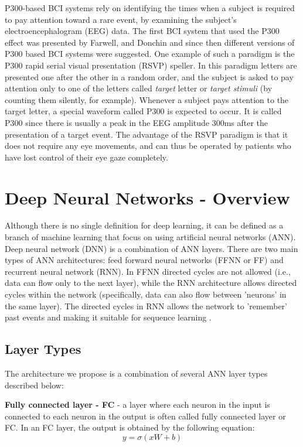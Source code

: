 \documentclass[
12pt, %
english, %
doublespacing, %
headsepline, %
]{MastersDoctoralThesis} %
\begin{document}
P300-based BCI systems rely on identifying the times when a subject is required to pay attention toward a rare event, by examining the subject's electroencephalogram (EEG) data. The first BCI system that used the P300 effect was presented by Farwell, and Donchin \cite{FirstP300} and since then different versions of P300 based BCI systems were suggested. One example of such a paradigm is the P300 rapid serial visual presentation (RSVP) speller. In this paradigm letters are presented one after the other in a random order, and the subject is asked to pay attention only to one of the letters called \textit{target} letter or \textit{target stimuli} (by counting them silently, for example). Whenever a subject pays attention to the target letter, a special waveform called P300 is expected to occur. It is called P300 since there is usually a peak in the EEG amplitude 300ms after the presentation of a target event. The advantage of the RSVP paradigm is that it does not require any eye movements, and can thus be operated by patients who have lost control of their eye gaze completely.

\section{Deep Neural Networks - Overview}

Although there is no single definition for deep learning, it can be defined as a branch of machine learning that focus on using artificial neural networks (ANN). Deep neural network (DNN) is a combination of ANN layers. There are two main types of ANN architectures: feed forward neural networks (FFNN or FF) and recurrent neural network (RNN). In FFNN directed cycles are not allowed (i.e., data can flow only to the next layer), while the RNN architecture allows directed cycles within the network (specifically, data can also flow between 'neurons' in the same layer). The directed cycles in RNN allows the network to 'remember' past events and making it suitable for sequence learning \cite{rumelhart1985learning}.

\subsection{Layer Types}
The architecture we propose is a combination of several ANN layer types described below:

\textbf{Fully connected layer - FC} - a layer where each neuron in the input is connected to each neuron in the output is often called fully connected layer or FC. In an FC layer, the output is obtained by the following equation:
\[y=\sigma \left( {xW + b} \right)\]
\end{document}
